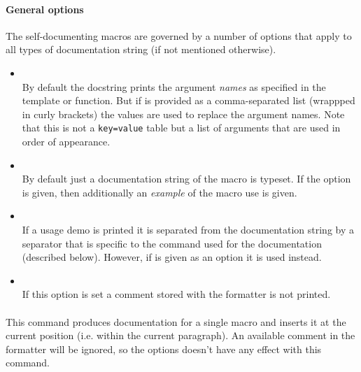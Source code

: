 \documentclass[12pt]{scrartcl}
\begin{document}
\paragraph{General options}

The self-documenting macros are governed by a number of options that apply to
all types of documentation string (if not mentioned otherwise).

\begin{itemize}
	\item {}\\
	By default the docstring prints the argument \emph{names} as specified in the
	template or function.  But if  is provided as a comma-separated
	list (wrappped in curly brackets) the values are used to replace the argument
	names.  Note that this is not a \texttt{key=value} table but a list of arguments
	that are used in order of appearance.
	\item {}\\
	By default just a documentation string of the macro is typeset.  If the
	 option is given, then additionally an \emph{example} of the macro
	use is given.
	\item {}\\
	If a usage demo is printed it is separated from the documentation string by a
	separator that is specific to the command used for the documentation (described
	below).  However, if  is given as an option it is used instead.
	\item {}\\
	If this option is set a comment stored with the formatter is not printed.
\end{itemize}

\paragraph{\texttt{}}

This command produces documentation for a single macro and inserts it at the
current position (i.e. within the current paragraph).  An available comment in
the formatter will be ignored, so the  options doesn't have
any effect with this command.
\end{document}
